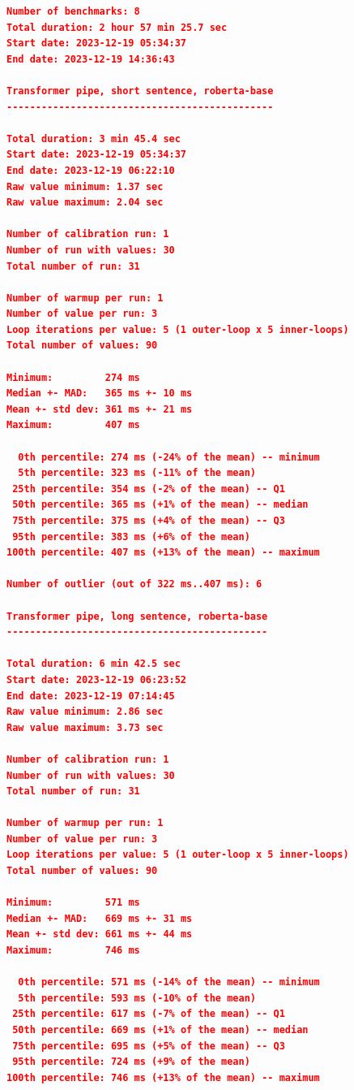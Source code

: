 \begin{lstlisting}[language=json]
Number of benchmarks: 8
Total duration: 2 hour 57 min 25.7 sec
Start date: 2023-12-19 05:34:37
End date: 2023-12-19 14:36:43

Transformer pipe, short sentence, roberta-base
----------------------------------------------

Total duration: 3 min 45.4 sec
Start date: 2023-12-19 05:34:37
End date: 2023-12-19 06:22:10
Raw value minimum: 1.37 sec
Raw value maximum: 2.04 sec

Number of calibration run: 1
Number of run with values: 30
Total number of run: 31

Number of warmup per run: 1
Number of value per run: 3
Loop iterations per value: 5 (1 outer-loop x 5 inner-loops)
Total number of values: 90

Minimum:         274 ms
Median +- MAD:   365 ms +- 10 ms
Mean +- std dev: 361 ms +- 21 ms
Maximum:         407 ms

  0th percentile: 274 ms (-24% of the mean) -- minimum
  5th percentile: 323 ms (-11% of the mean)
 25th percentile: 354 ms (-2% of the mean) -- Q1
 50th percentile: 365 ms (+1% of the mean) -- median
 75th percentile: 375 ms (+4% of the mean) -- Q3
 95th percentile: 383 ms (+6% of the mean)
100th percentile: 407 ms (+13% of the mean) -- maximum

Number of outlier (out of 322 ms..407 ms): 6

Transformer pipe, long sentence, roberta-base
---------------------------------------------

Total duration: 6 min 42.5 sec
Start date: 2023-12-19 06:23:52
End date: 2023-12-19 07:14:45
Raw value minimum: 2.86 sec
Raw value maximum: 3.73 sec

Number of calibration run: 1
Number of run with values: 30
Total number of run: 31

Number of warmup per run: 1
Number of value per run: 3
Loop iterations per value: 5 (1 outer-loop x 5 inner-loops)
Total number of values: 90

Minimum:         571 ms
Median +- MAD:   669 ms +- 31 ms
Mean +- std dev: 661 ms +- 44 ms
Maximum:         746 ms

  0th percentile: 571 ms (-14% of the mean) -- minimum
  5th percentile: 593 ms (-10% of the mean)
 25th percentile: 617 ms (-7% of the mean) -- Q1
 50th percentile: 669 ms (+1% of the mean) -- median
 75th percentile: 695 ms (+5% of the mean) -- Q3
 95th percentile: 724 ms (+9% of the mean)
100th percentile: 746 ms (+13% of the mean) -- maximum


\end{lstlisting}
